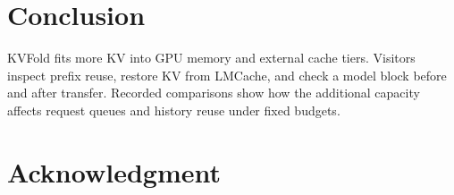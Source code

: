 \documentclass[conference]{IEEEtran}
\begin{document}
\section{Conclusion}
KVFold fits more KV into GPU memory and external cache tiers. Visitors
inspect prefix reuse, restore KV from LMCache, and check a model block
before and after transfer. Recorded comparisons show how the additional
capacity affects request queues and history reuse under fixed budgets.

\section*{Acknowledgment}



\end{document}
